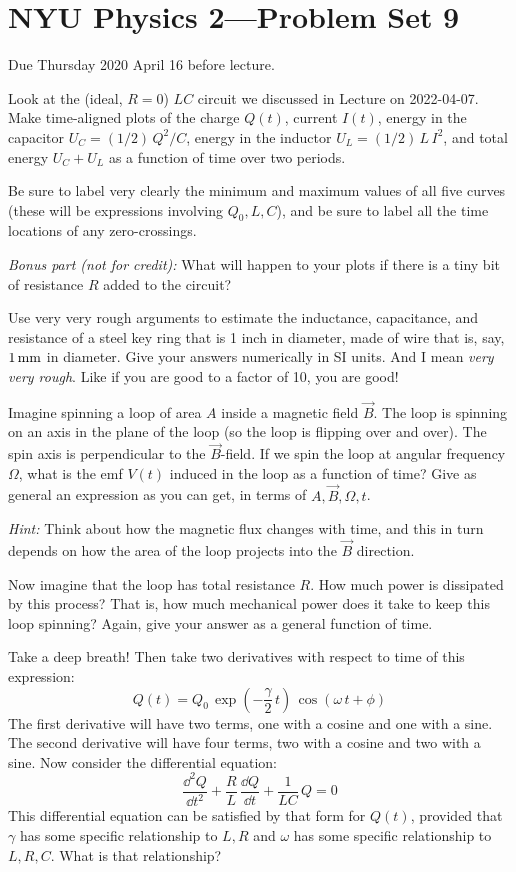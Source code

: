 \documentclass[12pt]{article}
\begin{document}
\section*{NYU Physics 2---Problem Set 9}

Due Thursday 2020 April 16 before lecture.

\startproblem%
Look at the (ideal, $R=0$) $LC$ circuit we discussed in Lecture on
2022-04-07. Make time-aligned plots of the charge
$Q(t)$, current $I(t)$, energy in the capacitor $U_C=(1/2)\,Q^2/C$,
energy in the inductor $U_L=(1/2)\,L\,I^2$, and total energy $U_C+U_L$
as a function of time over two periods.

Be sure to label very clearly the minimum and maximum values of all
five curves (these will be expressions involving $Q_0, L, C$), and be
sure to label all the time locations of any zero-crossings.

\textsl{Bonus part (not for credit):} What will happen to your plots
if there is a tiny bit of resistance $R$ added to the circuit?

\startproblem%
Use very very rough arguments to estimate the inductance, capacitance,
and resistance of a steel key ring that is 1 inch in diameter, made of
wire that is, say, $1\,\mathrm{mm}$ in diameter. Give your answers numerically
in SI units.
And I mean \emph{very very rough}. Like if you are good to a factor of
10, you are good!

\startproblem%
Imagine spinning a loop of area $A$ inside a magnetic field $\vec{B}$.
The loop is spinning on an axis in the plane of the loop (so the loop
is flipping over and over).  The spin axis is perpendicular to the
$\vec{B}$-field.  If we spin the loop at angular frequency $\Omega$,
what is the emf $V(t)$ induced in the loop as a function of time? Give as
general an expression as you can get, in terms of $A, \vec{B}, \Omega, t$.

\textsl{Hint:} Think about how the magnetic flux changes with time,
and this in turn depends on how the area of the loop projects into the
$\vec{B}$ direction.

Now imagine that the loop has total resistance $R$. How much power is
dissipated by this process? That is, how much mechanical power does it
take to keep this loop spinning? Again, give your answer as a general function of time.

\startproblem%
Take a deep breath!
Then take two derivatives with respect to time of this expression:
\begin{equation}
  Q(t) = Q_0\,\exp(-\frac{\gamma}{2}\,t)\,\cos(\omega\,t+\phi)
\end{equation}
The first derivative will have two terms, one with a cosine and one
with a sine. The second derivative will have four terms, two with a
cosine and two with a sine. Now consider the differential equation:
\begin{equation}
  \frac{\dd^2 Q}{\dd t^2} + \frac{R}{L}\,\frac{\dd Q}{\dd t} + \frac{1}{LC}\,Q = 0
\end{equation}
This differential equation can be satisfied by that form for $Q(t)$,
provided that $\gamma$ has some specific relationship to $L, R$ and
$\omega$ has some specific relationship to $L, R, C$. What is that
relationship?
\end{document}
